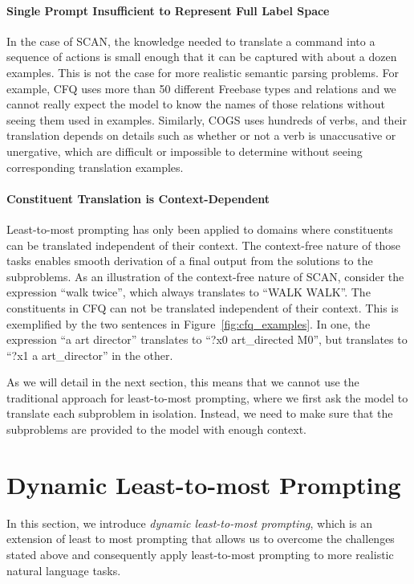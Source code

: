\documentclass{article} \usepackage{iclr2022_conference,times}
\begin{document}
\paragraph{Single Prompt Insufficient to Represent Full Label Space}
In the case of SCAN, the knowledge needed to translate a command into a sequence of actions is small enough that it can be captured with about a dozen examples. This is not the case for more realistic semantic parsing problems. For example, CFQ uses more than 50 different Freebase types and relations and we cannot really expect the model to know the names of those relations without seeing them used in examples. Similarly, COGS uses hundreds of verbs, and their translation depends on details such as whether or not a verb is unaccusative or unergative, which are difficult or impossible to determine without seeing corresponding translation examples.

\paragraph{Constituent Translation is Context-Dependent}
Least-to-most prompting has only been applied to domains where constituents can be translated independent of their context.
The context-free nature of those tasks enables smooth derivation of a final output from the solutions to the subproblems.
As an illustration of the context-free nature of SCAN, consider the expression ``walk twice'', which always translates to ``WALK WALK''. The constituents in CFQ can not be translated independent of their context. This is exemplified by the two sentences in Figure~\ref{fig:cfq_examples}. In one, the expression ``a art director'' translates to ``?x0 art\_directed M0'', but translates to ``?x1 a art\_director'' in the other.

As we will detail in the next section, this means that we cannot use the traditional approach for least-to-most prompting, where we first ask the model to translate each subproblem in isolation. Instead, we need to make sure that the subproblems are provided to the model with enough context.


\section{Dynamic Least-to-most Prompting \label{sec:dynamic_l2m}}
In this section, we introduce \textit{dynamic least-to-most prompting}, which is an extension of least to most prompting that allows us to overcome the challenges stated above and consequently apply least-to-most prompting to more realistic natural language tasks.
\end{document}
